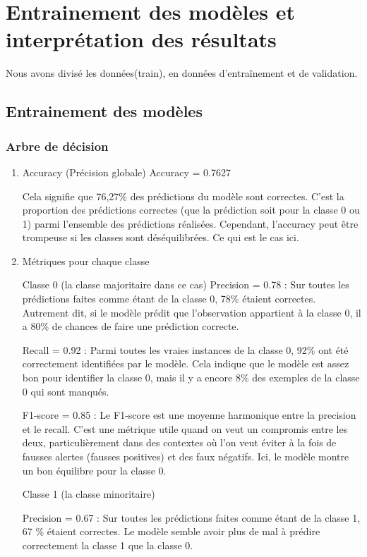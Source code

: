 
\chapter{Entrainement des modèles et interprétation des résultats }
\epigraph{ Nous avons divisé les données(train), en données d'entraînement et de validation.}{}
\minitoc
\newpage
\section{Entrainement des modèles}
\subsection{Arbre de décision}
\begin{flushleft}
\begin{enumerate}
\item Accuracy (Précision globale)
Accuracy = 0.7627

Cela signifie que 76,27\% des prédictions du modèle sont correctes. C'est la proportion des prédictions correctes (que la prédiction soit pour la classe 0 ou 1) parmi l'ensemble des prédictions réalisées. Cependant, l'accuracy peut être trompeuse si les classes sont déséquilibrées. Ce qui est le cas ici.

\item Métriques pour chaque classe

Classe 0 (la classe majoritaire dans ce cas)
Precision = 0.78 :
Sur toutes les prédictions faites comme étant de la classe 0, 78\% étaient correctes. Autrement dit, si le modèle prédit que l'observation appartient à la classe 0, il a 80\% de chances de faire une prédiction correcte.

Recall = 0.92 :
Parmi toutes les vraies instances de la classe 0, 92\% ont été correctement identifiées par le modèle. Cela indique que le modèle est assez bon pour identifier la classe 0, mais il y a encore 8\% des exemples de la classe 0 qui sont manqués.

F1-score = 0.85 :
Le F1-score est une moyenne harmonique entre la precision et le recall. C'est une métrique utile quand on veut un compromis entre les deux, particulièrement dans des contextes où l'on veut éviter à la fois de fausses alertes (fausses positives) et des faux négatifs. Ici, le modèle montre un bon équilibre pour la classe 0.

Classe 1 (la classe minoritaire)

Precision = 0.67 : 
Sur toutes les prédictions faites comme étant de la classe 1, 67 \% étaient correctes. Le modèle semble avoir plus de mal à prédire correctement la classe 1 que la classe 0.


\end{enumerate}
\end{flushleft}

